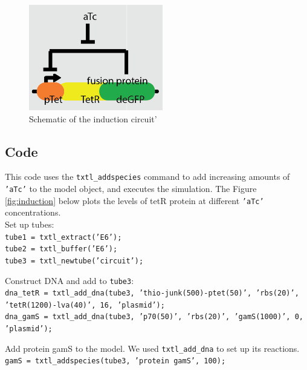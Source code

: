 \documentclass[english]{report}
\begin{document}
		\begin{figure}
		\begin{center}
		\includegraphics{negautoreg_induction schematic.png} 
		\caption{Schematic of the induction circuit'}
		\label{fig:inductionSchematic}
		\end{center}
		\end{figure}		
		
		 
		\subsection{Code}
		This code uses the \texttt{txtl\_addspecies} command to add increasing amounts of \texttt{'aTc'} to the model object, and executes the simulation. The Figure \ref{fig:induction} below plots the levels of tetR protein at different \texttt{'aTc'} concentrations. \\
		
		Set up tubes: \\
\noindent \texttt{tube1 = txtl\_extract('E6');} \\
\texttt{tube2 = txtl\_buffer('E6');} \\
\texttt{tube3 = txtl\_newtube('circuit');} 
\vspace*{1\baselineskip}
		
		Construct DNA and add to \texttt{tube3}: \\						
\noindent \texttt{dna\_tetR = txtl\_add\_dna(tube3, 'thio-junk(500)-ptet(50)', 'rbs(20)', 'tetR(1200)-lva(40)', 16, 'plasmid'); } \\
\texttt{dna\_gamS = txtl\_add\_dna(tube3, 'p70(50)', 'rbs(20)', 'gamS(1000)', 0, 'plasmid');}
\vspace*{1\baselineskip}
			
		Add protein gamS to the model. We used \texttt{txtl\_add\_dna} to set up its reactions. \\
		
		\noindent \texttt{gamS = txtl\_addspecies(tube3, 'protein gamS', 100);}
\vspace*{1\baselineskip}
				
\end{document}
